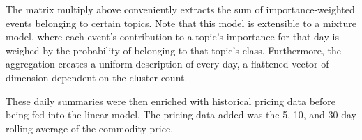 The matrix multiply above conveniently extracts the sum of importance-weighted events belonging to certain topics. Note that this model is extensible to a mixture model, where each event's contribution to a topic's importance for that day is weighed by the probability of belonging to that topic's class. Furthermore, the aggregation creates a uniform description of every day, a flattened vector of dimension dependent on the cluster count.

These daily summaries were then enriched with historical pricing data before being fed into the linear model. The pricing data added was the 5, 10, and 30 day rolling average of the commodity price. %
